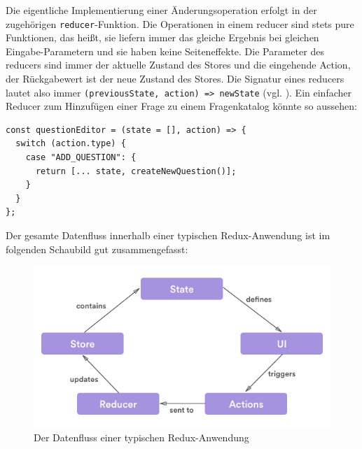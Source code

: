 Die eigentliche Implementierung einer Änderungsoperation erfolgt in der zugehörigen \texttt{reducer}-Funktion. Die Operationen in einem reducer sind stets pure Funktionen, das heißt, sie liefern immer das gleiche Ergebnis bei gleichen Eingabe-Parametern und sie haben keine Seiteneffekte. Die Parameter des reducers sind immer der aktuelle Zustand des Stores und die eingehende Action, der Rückgabewert ist der neue Zustand des Stores. Die Signatur eines reducers lautet also immer  \texttt{(previousState, action) => newState} (vgl. \cite{web:redux_reducers}). Ein einfacher Reducer zum Hinzufügen einer Frage zu einem Fragenkatalog könnte so aussehen:

\begin{minipage}{\linewidth}
\begin{lstlisting}[caption={In einem Reducer werden die Änderungsoperationen eines Stores als pure Funktion implementiert.}]
const questionEditor = (state = [], action) => {
  switch (action.type) {
    case "ADD_QUESTION": {
      return [... state, createNewQuestion()];
    }
  }
};
\end{lstlisting}
\end{minipage}

Der gesamte Datenfluss innerhalb einer typischen Redux-Anwendung ist im folgenden Schaubild gut zusammengefasst:

\begin{figure}[H]
    \includegraphics[width=\textwidth]{chapter/entwurf/bilder/redux_flow.png}
    \centering
    \caption[Datenfluss einer typischen Redux-Anwendung.]{Der Datenfluss einer typischen Redux-Anwendung\protect\footnotemark}
    \label{abb:redux_flow}
\end{figure}



